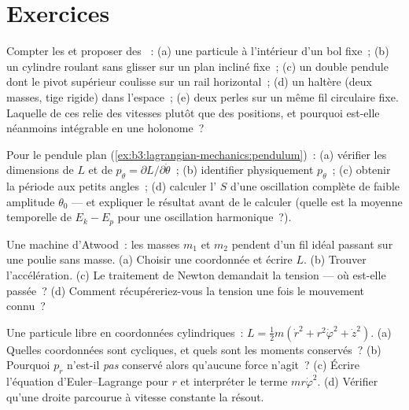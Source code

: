 \section{Exercices}

\begin{exercise}[$\star$]\label{exo:b3:lagrangian-mechanics:1}
Compter les  et proposer des ~: (a) une particule à l'intérieur d'un bol fixe~; (b) un
cylindre roulant sans glisser sur un plan incliné fixe~; (c) un double
pendule dont le pivot supérieur coulisse sur un rail horizontal~; (d)
un haltère (deux masses, tige rigide) dans l'espace~; (e) deux perles
sur un même fil circulaire fixe. Laquelle de ces  relie des
vitesses plutôt que des positions, et pourquoi est-elle néanmoins
intégrable en une  holonome~?
\end{exercise}

\begin{exercise}[$\star$]\label{exo:b3:lagrangian-mechanics:2}
Pour le pendule plan (\cref{ex:b3:lagrangian-mechanics:pendulum})~:
(a) vérifier les dimensions de $L$ et de $p_\theta =
\partial L/\partial\dot\theta$~; (b) identifier physiquement
$p_\theta$~; (c) obtenir la période aux petits angles~; (d) calculer
l' $S$ d'une oscillation complète de faible amplitude $\theta_0$
--- et expliquer le résultat avant de le calculer (quelle est la
moyenne temporelle de $E_k - E_p$ pour une oscillation harmonique~?).
\end{exercise}

\begin{exercise}[$\star$]\label{exo:b3:lagrangian-mechanics:3}
Une machine d'Atwood~: les masses $m_1$ et $m_2$ pendent d'un fil idéal
passant sur une poulie sans masse. (a) Choisir une coordonnée et
écrire $L$. (b) Trouver l'accélération. (c) Le traitement de Newton
demandait la tension --- où est-elle passée~? (d) Comment
récupéreriez-vous la tension une fois le mouvement connu~?
\end{exercise}

\begin{exercise}[$\star$]\label{exo:b3:lagrangian-mechanics:4}
Une particule libre en coordonnées cylindriques~: $L = \tfrac12 m(\dot r^2 +
r^2\dot\varphi^2 + \dot z^2)$. (a) Quelles coordonnées sont cycliques,
et quels sont les moments conservés~? (b) Pourquoi $p_r$ n'est-il
\emph{pas} conservé alors qu'aucune force n'agit~? (c) Écrire
l'équation d'Euler--Lagrange pour $r$ et interpréter le terme
$mr\dot\varphi^2$. (d) Vérifier qu'une droite parcourue à vitesse
constante la résout.
\end{exercise}

